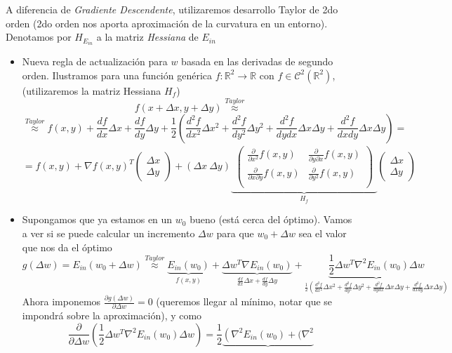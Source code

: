 \documentclass[11pt,a4paper]{article}
\theoremstyle{definition}
\newcommand{\R}{\mathbb{R}}
\begin{document}
	A diferencia de \textit{Gradiente Descendente}, utilizaremos desarrollo Taylor de 2do orden (2do orden nos aporta aproximación de la curvatura en un entorno). Denotamos por $H_{E_{in}}$ a la matriz \textit{Hessiana} de $E_{in}$
	\begin{itemize}
	\item Nueva regla de actualización para $w$ basada en las derivadas de segundo orden. Ilustramos para una función genérica $f\colon \R^2 \to \R$ con $f\in \mathcal{C}^2(\R^2)$, (utilizaremos la matriz Hessiana  $H_f$)
	$$f(x+\Delta x,y + \Delta y)\stackrel{Taylor}{\approx}$$
	$$\stackrel{Taylor}{\approx} f(x,y)+\frac{df}{dx}\Delta x+ \frac{df}{dy}\Delta y + \frac{1}{2}\left(\frac{d^2f}{dx^2} \Delta x^2 + \frac{d^2f}{dy^2} \Delta y^2 + \frac{d^2 f}{dydx} \Delta x \Delta y + \frac{d^2 f}{dxdy} \Delta x \Delta y\right)=$$
	$$=f(x,y)+\nabla f(x,y)^T \begin{pmatrix}\Delta x\\ \Delta y \end{pmatrix} + (\Delta x \ \Delta y) \underbrace{\begin{matrix}
	 \left(\begin{matrix}
	\frac{\partial}{\partial x^2} f(x,y) & \frac{\partial}{\partial y \partial x} f(x,y) \\
	\frac{\partial}{\partial x \partial y} f(x,y) & \frac{\partial}{\partial y^2} f(x,y)\\
	\end{matrix}\right)
	\end{matrix}}_{H_f}  
	\begin{pmatrix}\Delta x\\ \Delta y \end{pmatrix}$$	
	\item Supongamos que ya estamos en un $w_0$ bueno (está cerca del óptimo). Vamos a ver si se puede calcular un incremento $\Delta w$ para que $w_0+ \Delta w$ sea el valor que nos da el óptimo
	$$g(\Delta w)=E_{in}(w_0+\Delta w) \stackrel{Taylor}{\approx} \underbrace{E_{in}(w_0)}_{f(x,y)}+\underbrace{\Delta w^T\nabla E_{in}(w_0)}_{\frac{df}{dx}\Delta x+ \frac{df}{dy}\Delta y }+\underbrace{\frac{1}{2} \Delta w^T \nabla ^2 E_{in} (w_0)\Delta w}_{\frac{1}{2}\left(\frac{d^2f}{dx^2} \Delta x^2 + \frac{d^2f}{dy^2} \Delta y^2 + \frac{d^2 f}{dydx} \Delta x \Delta y + \frac{d^2 f}{dxdy} \Delta x \Delta y\right)}$$
	Ahora imponemos $\frac{\partial g(\Delta w)}{\partial\Delta w}=0$ (queremos llegar al mínimo, notar que se impondrá sobre la aproximación), y como 
	$$\frac{\partial}{\partial \Delta w} \left( \frac{1}{2} \Delta w^T \nabla ^2 E_{in} (w_0)\Delta w \right) = \frac{1}{2} \underbrace{\left( \nabla ^2 E_{in}(w_0) + (\nabla ^2 
}$$
\end{itemize}
\end{document}
